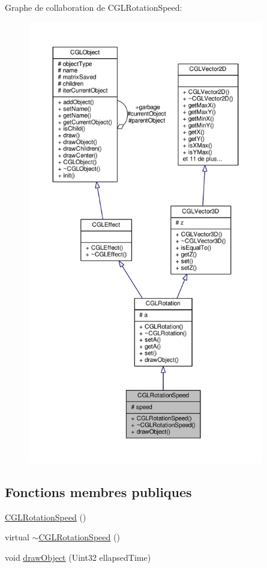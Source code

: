 Graphe de collaboration de C\-G\-L\-Rotation\-Speed\-:
\nopagebreak
\begin{figure}[H]
\begin{center}
\leavevmode
\includegraphics[height=550pt]{d1/dfb/class_c_g_l_rotation_speed__coll__graph}
\end{center}
\end{figure}
\subsection*{Fonctions membres publiques}
\begin{DoxyCompactItemize}
\item 
\hyperlink{class_c_g_l_rotation_speed_a6aed31b80ba1f7e050500469bf62e588}{C\-G\-L\-Rotation\-Speed} ()
\item 
virtual \hyperlink{class_c_g_l_rotation_speed_a7648604709da051825044630da6db987}{$\sim$\-C\-G\-L\-Rotation\-Speed} ()
\item 
void \hyperlink{class_c_g_l_rotation_speed_a6549d856fc0ad620fd1507744104797f}{draw\-Object} (Uint32 ellapsed\-Time)
\end{DoxyCompactItemize}
